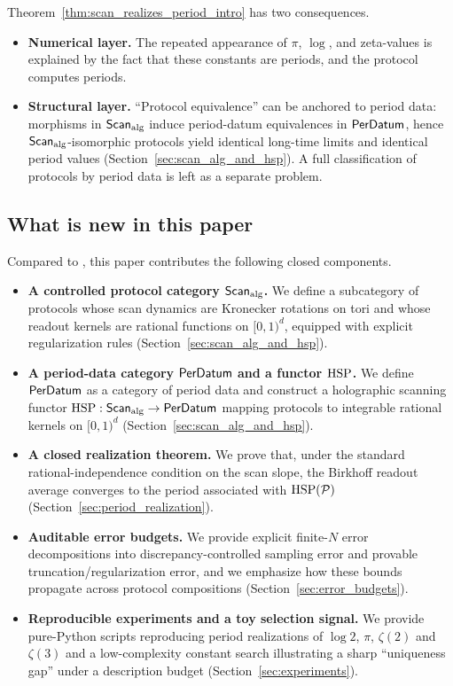 Theorem~\ref{thm:scan_realizes_period_intro} has two consequences.
\begin{itemize}
\item \textbf{Numerical layer.} The repeated appearance of $\pi$, $\log$, and zeta-values is explained by the fact that these constants are periods, and the protocol computes periods.
\item \textbf{Structural layer.} ``Protocol equivalence'' can be anchored to period data: morphisms in $\mathsf{Scan}_{\mathrm{alg}}$ induce period-datum equivalences in $\mathsf{PerDatum}$, hence $\mathsf{Scan}_{\mathrm{alg}}$-isomorphic protocols yield identical long-time limits and identical period values (Section~\ref{sec:scan_alg_and_hsp}). A full classification of protocols by period data is left as a separate problem.
\end{itemize}

\subsection{What is new in this paper}
\label{sec:contributions}

Compared to \cite{Ma2025STI}, this paper contributes the following closed components.
\begin{itemize}
\item \textbf{A controlled protocol category $\mathsf{Scan}_{\mathrm{alg}}$.} We define a subcategory of protocols whose scan dynamics are Kronecker rotations on tori and whose readout kernels are rational functions on $[0,1)^d$, equipped with explicit regularization rules (Section~\ref{sec:scan_alg_and_hsp}).
\item \textbf{A period-data category $\mathsf{PerDatum}$ and a functor $\mathrm{HSP}$.} We define $\mathsf{PerDatum}$ as a category of period data and construct a holographic scanning functor $\mathrm{HSP}:\mathsf{Scan}_{\mathrm{alg}}\to\mathsf{PerDatum}$ mapping protocols to integrable rational kernels on $[0,1)^d$ (Section~\ref{sec:scan_alg_and_hsp}).
\item \textbf{A closed realization theorem.} We prove that, under the standard rational-independence condition on the scan slope, the Birkhoff readout average converges to the period associated with $\mathrm{HSP}(\mathcal{P})$ (Section~\ref{sec:period_realization}).
\item \textbf{Auditable error budgets.} We provide explicit finite-$N$ error decompositions into discrepancy-controlled sampling error and provable truncation/regularization error, and we emphasize how these bounds propagate across protocol compositions (Section~\ref{sec:error_budgets}).
\item \textbf{Reproducible experiments and a toy selection signal.} We provide pure-Python scripts reproducing period realizations of $\log 2$, $\pi$, $\zeta(2)$ and $\zeta(3)$ and a low-complexity constant search illustrating a sharp ``uniqueness gap'' under a description budget (Section~\ref{sec:experiments}).
\end{itemize}

